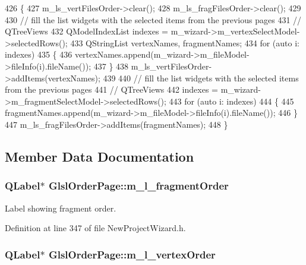 \begin{DoxyCode}
426 \{
427   m_ls_vertFilesOrder->clear();
428   m_ls_fragFilesOrder->clear();
429 
430   \textcolor{comment}{// fill the list widgets with the selected items from the previous pages}
431   \textcolor{comment}{// QTreeViews}
432   QModelIndexList indexes = m_wizard->m_vertexSelectModel->selectedRows();
433   QStringList vertexNames, fragmentNames;
434   \textcolor{keywordflow}{for} (\textcolor{keyword}{auto} i: indexes)
435   \{
436     vertexNames.append(m_wizard->m_fileModel->fileInfo(i).fileName());
437   \}
438   m_ls_vertFilesOrder->addItems(vertexNames);
439 
440   \textcolor{comment}{// fill the list widgets with the selected items from the previous pages}
441   \textcolor{comment}{// QTreeViews}
442   indexes = m_wizard->m_fragmentSelectModel->selectedRows();
443   \textcolor{keywordflow}{for} (\textcolor{keyword}{auto} i: indexes)
444   \{
445     fragmentNames.append(m_wizard->m_fileModel->fileInfo(i).fileName());
446   \}
447   m_ls_fragFilesOrder->addItems(fragmentNames);
448 \}
\end{DoxyCode}


\subsection{Member Data Documentation}
\subsubsection[{m\-\_\-l\-\_\-fragment\-Order}]{\setlength{\rightskip}{0pt plus 5cm}Q\-Label$\ast$ Glsl\-Order\-Page\-::m\-\_\-l\-\_\-fragment\-Order\hspace{0.3cm}{\ttfamily [private]}}\label{class_glsl_order_page_a6470696df3b64e551fa558b4c421d938}


Label showing fragment order. 



Definition at line 347 of file New\-Project\-Wizard.\-h.

\subsubsection[{m\-\_\-l\-\_\-vertex\-Order}]{\setlength{\rightskip}{0pt plus 5cm}Q\-Label$\ast$ Glsl\-Order\-Page\-::m\-\_\-l\-\_\-vertex\-Order\hspace{0.3cm}{\ttfamily [private]}}\label{class_glsl_order_page_a3a353d35ca8d4c8009c079fea4edde61}


